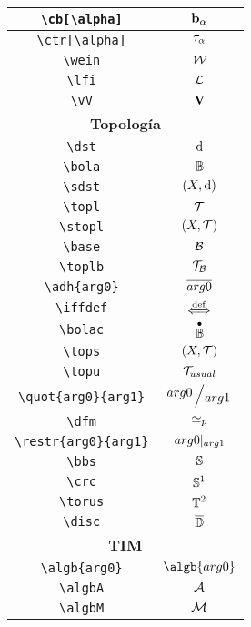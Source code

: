 \begin{longtable}{|c|c|}
\verb|\cb[\alpha]| & $\displaystyle\cb[\alpha]$ \\ \hline 
\verb|\ctr[\alpha]| & $\displaystyle\ctr[\alpha]$ \\ \hline 
\verb|\wein| & $\displaystyle\wein$ \\ \hline 
\verb|\lfi| & $\displaystyle\lfi$ \\ \hline 
\verb|\vV| & $\displaystyle\vV$ \\ \hline 
\multicolumn{2}{|c|}{\textbf{Topología}} \\ \hline 
\verb|\dst| & $\displaystyle\dst$ \\ \hline 
\verb|\bola| & $\displaystyle\bola$ \\ \hline 
\verb|\sdst| & $\displaystyle\sdst$ \\ \hline 
\verb|\topl| & $\displaystyle\topl$ \\ \hline 
\verb|\stopl| & $\displaystyle\stopl$ \\ \hline 
\verb|\base| & $\displaystyle\base$ \\ \hline 
\verb|\toplb| & $\displaystyle\toplb$ \\ \hline 
\verb|\adh{arg0}| & $\displaystyle\adh{arg0}$ \\ \hline 
\verb|\iffdef| & $\displaystyle\iffdef$ \\ \hline 
\verb|\bolac| & $\displaystyle\bolac$ \\ \hline 
\verb|\tops| & $\displaystyle\tops$ \\ \hline 
\verb|\topu| & $\displaystyle\topu$ \\ \hline 
\verb|\quot{arg0}{arg1}| & $\displaystyle\quot{arg0}{arg1}$ \\ \hline 
\verb|\dfm| & $\displaystyle\dfm$ \\ \hline 
\verb|\restr{arg0}{arg1}| & $\displaystyle\restr{arg0}{arg1}$ \\ \hline 
\verb|\bbs| & $\displaystyle\bbs$ \\ \hline 
\verb|\crc| & $\displaystyle\crc$ \\ \hline 
\verb|\torus| & $\displaystyle\torus$ \\ \hline 
\verb|\disc| & $\displaystyle\disc$ \\ \hline 
\multicolumn{2}{|c|}{\textbf{TIM}} \\ \hline 
\verb|\algb{arg0}| & $\displaystyle\algb{arg0}$ \\ \hline 
\verb|\algbA| & $\displaystyle\algbA$ \\ \hline 
\verb|\algbM| & $\displaystyle\algbM$ \\ \hline 

\end{longtable}

